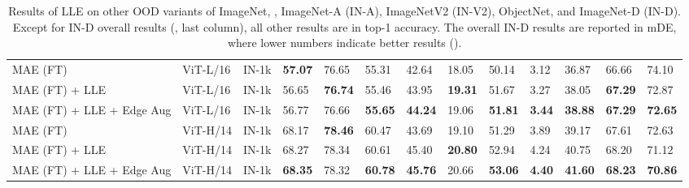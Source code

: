 \documentclass[10pt,twocolumn,letterpaper]{article}
\begin{document}
\begin{table}[t]
\begin{adjustbox}{width=\linewidth}
\begin{tabular}{@{}lllllllllllll@{}}
MAE (FT)                   & ViT-L/16  & IN-1k                                   & \textbf{57.07} & 76.65                      & 55.31                                                & 42.64          & 18.05          & 50.14          & 3.12           & 36.87                            & 66.66                          & 74.10          \\
MAE (FT) + LLE             & ViT-L/16  & IN-1k                                   & 56.65          & \textbf{76.74}             & 55.46                                                & 43.95          & \textbf{19.31} & 51.67          & 3.27           & 38.05                            & \textbf{67.29}                 & 72.87          \\
MAE (FT) + LLE + Edge Aug  & ViT-L/16  & IN-1k                                   & 56.77          & 76.66                      & \textbf{55.65}                                       & \textbf{44.24} & 19.06          & \textbf{51.81} & \textbf{3.44}  & \textbf{38.88}                   & \textbf{67.29}                 & \textbf{72.65} \\ \midrule
MAE (FT)                   & ViT-H/14  & IN-1k                                   & 68.17          & \textbf{78.46}             & 60.47                                                & 43.69          & 19.10          & 51.29          & 3.89           & 39.17                            & 67.61                          & 72.63          \\
MAE (FT) + LLE             & ViT-H/14  & IN-1k                                   & 68.27 & 78.34                      & 60.61                                       & 45.40 & \textbf{20.80} & 52.94 & 4.24  & 40.75                   & 68.20                 & 71.12 \\
MAE (FT) + LLE + Edge Aug            & ViT-H/14  & IN-1k                                   & \textbf{68.35} & 78.32                      & \textbf{60.78}                                       & \textbf{45.76} & 20.66 & \textbf{53.06} & \textbf{4.40}  & \textbf{41.60}                   & \textbf{68.23}                 & \textbf{70.86} \\\bottomrule
\end{tabular}
\end{adjustbox}
\caption{Results of LLE on other OOD variants of ImageNet, \ie, ImageNet-A (IN-A), ImageNetV2 (IN-V2), ObjectNet, and ImageNet-D (IN-D). Except for IN-D overall results (\ie, last column), all other results are in top-1 accuracy. The overall IN-D results are reported in mDE, where lower numbers indicate better results ().}
\label{appx:tab:lle_results_in_a_v2_objnet_d}
\end{table}
\end{document}
